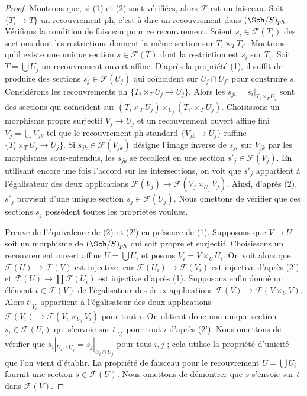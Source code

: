 \begin{proof}
Montrons que, si (1) et (2) sont vérifiées, alors $\mathcal{F}$ est un faisceau.
Soit $\{T_i \to T\}$ un recouvrement ph, c'est-à-dire un recouvrement dans $(\Sch/S)_{ph}$.
Vérifions la condition de faisceau pour ce recouvrement.
Soient $s_i \in \mathcal{F}(T_i)$ des sections dont les restrictions donnent la même
section sur $T_i \times_T T_{i'}$. Montrons qu'il existe une
unique section $s \in \mathcal{F}(T)$ dont la restriction est $s_i$ sur $T_i$.
Soit $T = \bigcup U_j$ un recouvrement ouvert affine.
D'après la propriété (1), il suffit de produire des sections $s_j \in \mathcal{F}(U_j)$
qui coïncident sur $U_j \cap U_{j'}$ pour construire $s$.
Considérons les recouvrements ph $\{T_i \times_T U_j \to U_j\}$.
Alors les $s_{ji} = s_i|_{T_i \times_T U_j}$ sont des sections qui coïncident
sur $(T_i \times_T U_j) \times_{U_j} (T_{i'} \times_T U_j)$.
Choisissons un morphisme propre surjectif $V_j \to U_j$ et un recouvrement ouvert
affine fini $V_j = \bigcup V_{jk}$ tel que le recouvrement ph standard
$\{V_{jk} \to U_j\}$ raffine $\{T_i \times_T U_j \to U_j\}$.
Si $s_{jk} \in \mathcal{F}(V_{jk})$
désigne l'image inverse de $s_{ji}$ sur $V_{jk}$ par les
morphismes sous-entendus, les $s_{jk}$ se recollent en une section
$s'_j \in \mathcal{F}(V_j)$. En utilisant encore une fois l'accord sur les intersections,
on voit que $s'_j$ appartient à l'égalisateur des deux
applications $\mathcal{F}(V_j) \to \mathcal{F}(V_j \times_{U_j} V_j)$.
Ainsi, d'après (2), $s'_j$ provient d'une unique section
$s_j \in \mathcal{F}(U_j)$. Nous omettons de vérifier que ces
sections $s_j$ possèdent toutes les propriétés voulues.

\medskip\noindent
Preuve de l'équivalence de (2) et (2') en présence de (1).
Supposons que $V \to U$ soit un morphisme de $(\Sch/S)_{ph}$ qui soit
propre et surjectif. Choisissons un
recouvrement ouvert affine $U = \bigcup U_i$ et posons $V_i = V \times_U U_i$.
On voit alors que $\mathcal{F}(U) \to \mathcal{F}(V)$
est injective, car $\mathcal{F}(U_i) \to \mathcal{F}(V_i)$
est injective d'après (2') et $\mathcal{F}(U) \to \prod \mathcal{F}(U_i)$
est injective d'après (1). Supposons enfin donné un élément
$t \in \mathcal{F}(V)$ de l'égalisateur des deux applications
$\mathcal{F}(V) \to \mathcal{F}(V \times_U V)$.
Alors $t|_{V_i}$ appartient à l'égalisateur des deux applications
$\mathcal{F}(V_i) \to \mathcal{F}(V_i \times_{U_i} V_i)$
pour tout $i$. On obtient donc une unique section $s_i \in \mathcal{F}(U_i)$
qui s'envoie sur $t|_{V_i}$ pour tout $i$ d'après (2').
Nous omettons de vérifier que $s_i|_{U_i \cap U_j} = s_j|_{U_i \cap U_j}$
pour tous $i, j$ ; cela utilise la propriété d'unicité que l'on vient d'établir.
La propriété de faisceau pour le recouvrement $U = \bigcup U_i$ fournit
une section $s \in \mathcal{F}(U)$. Nous omettons de démontrer que $s$
s'envoie sur $t$ dans $\mathcal{F}(V)$.
\end{proof}

